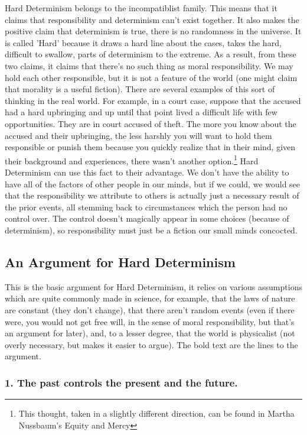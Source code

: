 Hard Determinism belongs to the incompatiblist family. This means that it claims that responsibility and determinism can't exist together. It also makes the positive claim that determinism is true, there is no randomness in the universe. It is called 'Hard' because it draws a hard line about the cases, takes the hard, difficult to swallow, parts of determinism to the extreme. As a result, from these two claims, it claims that there’s no such thing as moral responsibility. We may hold each other responsible, but it is not a feature of the world (one might claim that morality is a useful fiction). There are several examples of this sort of thinking in the real world. For example, in a court case, suppose that the accused had a hard upbringing and up until that point lived a difficult life with few opportunities. They are in court accused of theft. The more you know about the accused and their upbringing, the less harshly you will want to hold them responsible or punish them because you quickly realize that in their mind, given their background and experiences, there wasn't another option.\footnote{This thought, taken in a slightly different direction, can be found in Martha Nussbaum's Equity and Mercy} Hard Determinism can use this fact to their advantage. We don't have the ability to have all of the factors of other people in our minds, but if we could, we would see that the responsibility we attribute to others is actually just a necessary result of the prior events, all stemming back to circumstances which the person had no control over. The control doesn't magically appear in some choices (because of determinism), so responsibility must just be a fiction our small minds concocted.

\subsection{An Argument for Hard Determinism}
This is the basic argument for Hard Determinism, it relies on various assumptions which are quite commonly made in science, for example, that the laws of nature are constant (they don't change), that there aren't random events (even if there were, you would not get free will, in the sense of moral responsibility, but that's an argument for later), and, to a lesser degree, that the world is physicalist (not overly necessary, but makes it easier to argue).  The bold text are the lines to the argument.
\subsubsection{1. The past controls the present and the future.}

